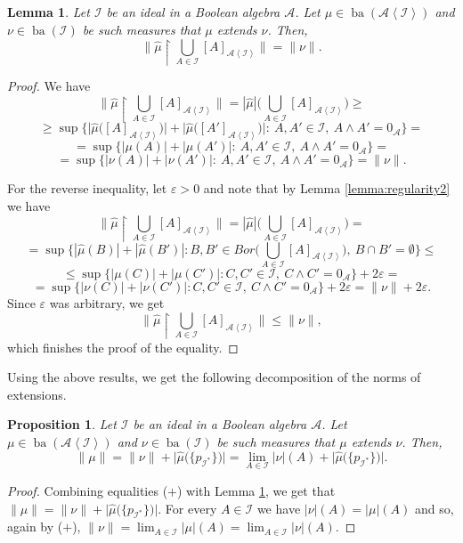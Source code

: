 \documentclass[a4paper,11pt,fleqn]{amsart}
\newtheorem{lemma}[theorem]{Lemma}
\newtheorem{proposition}[theorem]{Proposition}
\theoremstyle{definition}
\theoremstyle{remark}
\numberwithin{equation}{section}
\newcommand{\eps}{\varepsilon}
\newcommand{\aA}{\mathcal{A}}
\newcommand{\iI}{\mathcal{I}}
\DeclareMathOperator{\ba}{ba}
\newcommand{\rstr}{\restriction}
\newcommand{\sm}{\setminus}
\newcommand{\sub}{\subseteq}
\newcommand{\wh}{\widehat}
\newcommand{\gen}[1]{\mathopen{}\left\langle#1\mathclose{}\right\rangle}
\newcommand{\clopen}[1]{\left[#1\right]}
\begin{document}
\begin{lemma}\label{lemma:norms}
    Let $\iI$ be an ideal in a Boolean algebra $\aA$. Let $\mu\in\ba(\aA\gen{\iI})$ and $\nu\in\ba(\iI)$ be such measures that $\mu$ extends $\nu$. Then,
    \[\Big\|\wh{\mu}\rstr\bigcup_{A\in\iI}\clopen{A}_{\aA\gen{\iI}}\Big\|=\|\nu\|.\]
\end{lemma}
\begin{proof}
    We have
    \[\Big\|\wh{\mu}\rstr\bigcup_{A\in\iI}\clopen{A}_{\aA\gen{\iI}}\Big\|=|\wh{\mu}|\Big(\bigcup_{A\in\iI}\clopen{A}_{\aA\gen{\iI}}\Big)\ge\]
    \[\ge\sup\big\{\big|\wh{\mu}\big(\clopen{A}_{\aA\gen{\iI}}\big)\big|+\big|\wh{\mu}\big(\clopen{A'}_{\aA\gen{\iI}}\big)\big|\colon\ A,A'\in\iI,\ A\wedge A'=0_\aA\big\}=\]
    \[=\sup\big\{|\mu(A)|+|\mu(A')|\colon\ A,A'\in\iI,\ A\wedge A'=0_\aA\big\}=\]
    \[=\sup\big\{|\nu(A)|+|\nu(A')|\colon\ A,A'\in\iI,\ A\wedge A'=0_\aA\big\}=\|\nu\|.\]

    For the reverse inequality, let $\eps>0$ and note that by Lemma \ref{lemma:regularity2} we have%
    \[\Big\|\wh{\mu}\rstr\bigcup_{A\in\iI}\clopen{A}_{\aA\gen{\iI}}\Big\|=|\wh{\mu}|\Big(\bigcup_{A\in\iI}\clopen{A}_{\aA\gen{\iI}}\Big)=\]
    \[=\sup\bigg\{|\wh{\mu}(B)|+|\wh{\mu}(B')|\colon B,B'\in Bor\Big(\bigcup_{A\in\iI}\clopen{A}_{\aA\gen{\iI}}\Big),\ B\cap B'=\emptyset\bigg\}\le\]
    \[\le\sup\big\{|\mu(C)|+|\mu(C')|\colon C,C'\in\iI,\ C\wedge C'=0_\aA\big\}+2\eps=\]
    \[=\sup\big\{|\nu(C)|+|\nu(C')|\colon C,C'\in\iI,\ C\wedge C'=0_\aA\big\}+2\eps=\|\nu\|+2\eps.\]
    Since $\eps$ was arbitrary, we get
    \[\Big\|\wh{\mu}\rstr\bigcup_{A\in\iI}\clopen{A}_{\aA\gen{\iI}}\Big\|\le\|\nu\|,\]
    which finishes the proof of the equality.
\end{proof}

Using the above results, we get the following decomposition of the norms of extensions.

\begin{proposition}\label{prop:extension_norms}
    Let $\iI$ be an ideal in a Boolean algebra $\aA$. Let $\mu\in\ba(\aA\gen{\iI})$ and $\nu\in\ba(\iI)$ be such measures that $\mu$ extends $\nu$. Then,
    \[\|\mu\|=\|\nu\|+\big|\wh{\mu}\big(\big\{p_{\iI^*}\big\}\big)\big|=\lim_{A\in\iI}|\nu|(A)+\big|\wh{\mu}\big(\big\{p_{\iI^*}\big\}\big)\big|.\]
\end{proposition}
\begin{proof}
    Combining equalities ($+$) with Lemma \ref{lemma:norms}, we get that $\|\mu\|=\|\nu\|+\big|\wh{\mu}\big(\big\{p_{\iI^*}\big\}\big)\big|$. For every $A\in\iI$ we have $|\nu|(A)=|\mu|(A)$ and so, again by ($+$), $\|\nu\|=\lim_{A\in\iI}|\mu|(A)=\lim_{A\in\iI}|\nu|(A)$.
\end{proof}
\end{document}

